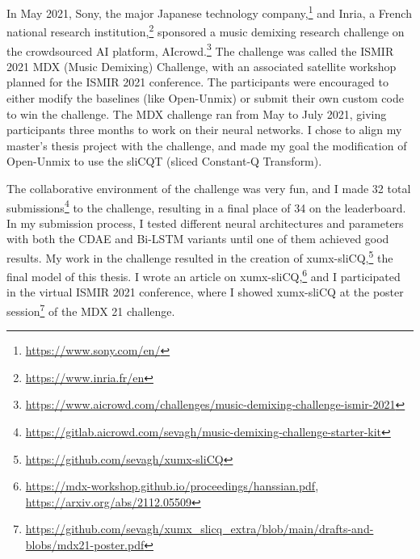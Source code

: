 \documentclass[report.tex]{subfiles}
\begin{document}
\begin{appendices}
In May 2021, Sony, the major Japanese technology company,\footnote{\url{https://www.sony.com/en/}} and Inria, a French national research institution,\footnote{\url{https://www.inria.fr/en}} sponsored a music demixing research challenge on the crowdsourced AI platform, AIcrowd.\footnote{\url{https://www.aicrowd.com/challenges/music-demixing-challenge-ismir-2021}} The challenge was called the ISMIR 2021 MDX (Music Demixing) Challenge, with an associated satellite workshop planned for the ISMIR 2021 conference. The participants were encouraged to either modify the baselines (like Open-Unmix) or submit their own custom code to win the challenge. The MDX challenge ran from May to July 2021, giving participants three months to work on their neural networks. I chose to align my master's thesis project with the challenge, and made my goal the modification of Open-Unmix to use the sliCQT (sliced Constant-Q Transform).

The collaborative environment of the challenge was very fun, and I made 32 total submissions\footnote{\url{https://gitlab.aicrowd.com/sevagh/music-demixing-challenge-starter-kit}} to the challenge, resulting in a final place of 34 on the leaderboard. In my submission process, I tested different neural architectures and parameters with both the CDAE and Bi-LSTM variants until one of them achieved good results. My work in the challenge resulted in the creation of xumx-sliCQ,\footnote{\url{https://github.com/sevagh/xumx-sliCQ}} the final model of this thesis. I wrote an article on xumx-sliCQ,\footnote{\url{https://mdx-workshop.github.io/proceedings/hanssian.pdf}, \url{https://arxiv.org/abs/2112.05509}} and I participated in the virtual ISMIR 2021 conference, where I showed xumx-sliCQ at the poster session\footnote{\url{https://github.com/sevagh/xumx_slicq_extra/blob/main/drafts-and-blobs/mdx21-poster.pdf}} of the MDX 21 challenge.

\end{appendices}
\end{document}
